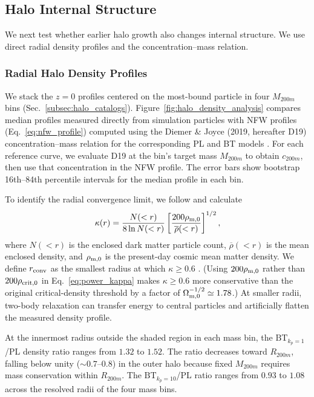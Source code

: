 \documentclass[
 reprint,
 superscriptaddress,
 nofootinbib,
 nobibnotes,
 amsmath,
 amssymb,
 aps,
 prd,
 floatfix,
 longbibliography
]{revtex4-2}
\DeclareRobustCommand{\change}[1]{#1}
\DeclareRobustCommand{\BTKPone}{\ensuremath{\mathrm{BT}_{k_p=1}}}
\DeclareRobustCommand{\BTKPten}{\ensuremath{\mathrm{BT}_{k_p=10}}}
\begin{document}
\subsection{Halo Internal Structure}

We next test whether earlier halo growth also changes internal structure. We use direct radial density profiles and the concentration--mass relation.

\subsubsection{Radial Halo Density Profiles\label{subsub:DensityProfile}}

We stack the \(z=0\) profiles centered on the most-bound particle in four \(M_{200m}\) bins (Sec.~\ref{subsec:halo_catalogs}). Figure~\ref{fig:halo_density_analysis} compares median profiles measured directly from simulation particles with NFW profiles (Eq.~\ref{eq:nfw_profile}) computed using the Diemer \& Joyce (2019, hereafter D19) concentration--mass relation for the corresponding PL and BT models \citep{Diemer2019}. \change{For each reference curve, we evaluate D19 at the bin's target mass \(M_{200m}\) to obtain \(c_{200m}\), then use that concentration in the NFW profile.} The error bars show bootstrap 16th--84th percentile intervals for the median profile in each bin.

To identify the radial convergence limit, we follow \citet{Power2003} and calculate
\begin{equation}
\kappa(r)=\frac{N(<r)}{8\ln N(<r)}
\left[\frac{200\rho_{{\rm m},0}}{\overline{\rho}(<r)}\right]^{1/2},
\label{eq:power_kappa}
\end{equation}
where \(N(<r)\) is the enclosed dark matter particle count, \(\overline{\rho}(<r)\) is the mean enclosed density, and \(\rho_{{\rm m},0}\) is the present-day cosmic mean matter density. We define \(r_{\rm conv}\) as the smallest radius at which \(\kappa\ge0.6\) \citep{Power2003}. (Using \(200\rho_{{\rm m},0}\) rather than \(200\rho_{{\rm crit},0}\) in Eq.~\eqref{eq:power_kappa} makes \(\kappa\ge0.6\) more conservative than the original critical-density threshold by a factor of \(\Omega_{{\rm m},0}^{-1/2}\simeq1.78\).) At smaller radii, two-body relaxation can transfer energy to central particles and artificially flatten the measured density profile.

At the innermost radius outside the shaded region in each mass bin, the \BTKPone{}/PL density ratio ranges from \(1.32\) to \(1.52\). The ratio decreases toward \(R_{200m}\), falling below unity (\(\sim0.7\)--\(0.8\)) in the outer halo because fixed \(M_{200m}\) requires mass conservation within \(R_{200m}\). The \BTKPten{}/PL ratio ranges from \(0.93\) to \(1.08\) across the resolved radii of the four mass bins.
\end{document}
